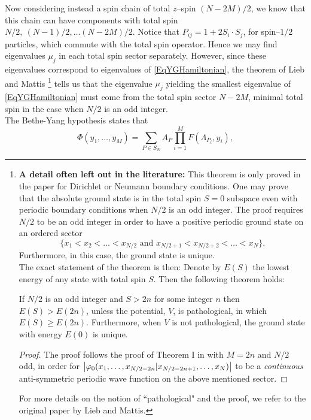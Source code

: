 Now considering instead a spin chain of total $ z $--spin $ (N-2M)/2 $, we know that this chain can have components with total spin $ N/2,\ (N-1)/2,\ldots (N-2M)/2 $. Notice that $ P_{ij}=1+2S_i\cdot S_j $, for spin--$ 1/2 $ particles, which commute with the total spin operator. Hence we may find eigenvalues $ \mu_j $ in each total spin sector separately. However, since these eigenvalues correspond to eigenvalues of \eqref{EqYGHamiltonian}, the theorem of Lieb and Mattis \cite{lieb1962theory}\footnote{\textbf{A detail often left out in the literature:} This theorem is only proved in the paper \cite{lieb1962theory} for Dirichlet or Neumann boundary conditions. One may prove that the absolute ground state is in the total spin $ S=0 $ subspace even with periodic boundary conditions when $ N/2 $ is an odd integer. The proof requires $ N/2 $ to be an odd integer in order to have a positive periodic ground state on an ordered sector $$ \{x_1<x_2<\ldots<x_{N/2}\text{ and } x_{N/2+1}<x_{N/2+2}<\ldots<x_N\}. $$
Furthermore, in this case, the ground state is unique.\\
The exact statement of the theorem is then: Denote by $ E(S) $ the lowest energy of any state with total spin $ S $. Then the following theorem holds:
\begin{theorem}[Lieb and Mattis, \cite{lieb1962theory}, for periodic boundary conditions, $ d=1 $]\label{TheoremLiebMattis}
	If $ N/2 $ is an odd integer and $ S>2n $ for some integer $ n $ then $ E(S)> E(2n) $, unless the potential, $ V $, is pathological, in which $ E(S)\geq E(2n) $. Furthermore, when $ V $ is not pathological, the ground state with energy $ E(0) $ is unique.
\end{theorem}
\begin{proof}
	The proof follows the proof of Theorem I in \cite{lieb1962theory} with $ M=2n $ and $ N/2 $ odd, in order for $ \left\lvert \varphi_0(x_1,\ldots,x_{N/2-2n}\vert x_{N/2-2n+1},\ldots,x_N) \right\rvert $ to be a \emph{continuous} anti-symmetric periodic wave function on the above mentioned sector.
\end{proof}
For more details on the notion of ``pathological" and the proof, we refer to the original paper by Lieb and Mattis.} tells us that the eigenvalue $ \mu_j $ yielding the smallest eigenvalue of \eqref{EqYGHamiltonian} must come from the total spin sector $ N-2M $, \ie minimal total spin in the case when $ N/2 $ is an odd integer.\\
The Bethe-Yang hypothesis states that \begin{equation}\label{EqBetheYangHypothesis}
\Phi(y_1,\ldots,y_M)=\sum_{P\in S_{N}}A_P \prod_{i=1}^{M}F(\Lambda_{P_i},y_i),
\end{equation}
